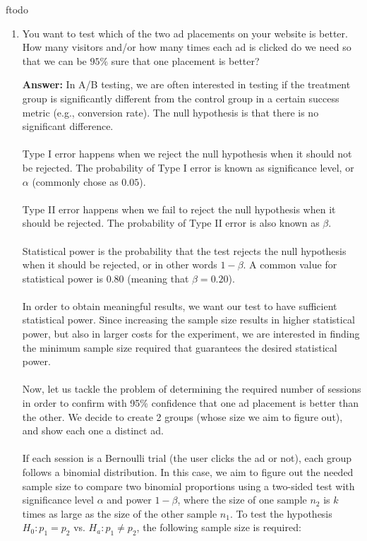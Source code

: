ƒtodo\documentclass{article}
\newenvironment{QandA}{\begin{enumerate}[label=\arabic*.]}{\end{enumerate}}
\newenvironment{answer}{\par\normalfont \textbf{Answer:}}{}
\begin{document}
\begin{QandA}
    \item You want to test which of the two ad placements on your website is better. How many visitors and/or how many times each ad is clicked do we need so that we can be $95\%$ sure that one placement is better?
    \begin{answer}
        In A/B testing, we are often interested in testing if the treatment group is significantly different from the control group in a certain success metric (e.g., conversion rate). The null hypothesis is that there is no significant difference. \\\\
        Type I error happens when we reject the null hypothesis when it should not be rejected. The probability of Type I error is known as significance level, or $\alpha$ (commonly chose as $0.05$). \\\\
        Type II error happens when we fail to reject the null hypothesis when it should be rejected. The probability of Type II error is also known as $\beta$.\\\\
        Statistical power is the probability that the test rejects the null hypothesis when it should be rejected, or in other words $1 - \beta$. A common value for statistical power is $0.80$ (meaning that $\beta = 0.20$). \\\\
        In order to obtain meaningful results, we want our test to have sufficient statistical power. Since increasing the sample size results in higher statistical power, but also in larger costs for the experiment, we are interested in finding the minimum sample size required that guarantees the desired statistical power. \\\\
        Now, let us tackle the problem of determining the required number of sessions in order to confirm with 95\% confidence that one ad placement is better than the other. We decide to create 2 groups (whose size we aim to figure out), and show each one a distinct ad. \\\\
        If each session is a Bernoulli trial (the user clicks the ad or not), each group follows a binomial distribution. In this case, we aim to figure out the needed sample size to compare two binomial proportions using a two-sided test with significance level $\alpha$ and power $1-\beta$, where the size of one sample $n_2$ is $k$ times as large as the size of the other sample $n_1$. To test the hypothesis $H_0: p_1 = p_2$ vs. $H_a: p_1 \neq p_2$, the following sample size is required:

\end{answer}
\end{QandA}
\end{document}

